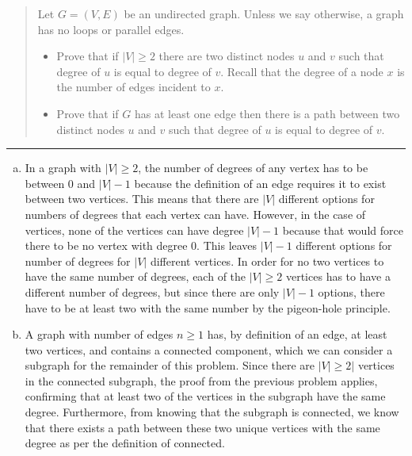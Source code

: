 \documentclass[11pt]{article}
\begin{document}



\begin{quote}
\item 
Let $G=(V,E)$ be an undirected graph. Unless we say otherwise, a graph has no loops or parallel edges.

\begin{itemize}
\item Prove that if $|V| \ge 2$ there are two distinct nodes $u$ and $v$ such that degree of $u$ is equal to degree of $v$.  Recall that the degree of a node $x$ is the number of edges incident to $x$.
\item Prove that if $G$ has at least one edge then there is a path between two distinct nodes $u$ and $v$ such that degree of $u$ is equal to degree of $v$.
\end{itemize}

\end{quote}
\hrule



\begin{solution}
\item 
\begin{enumerate}[(a)]
\item In a graph with $|V| \ge 2$, the number of degrees of any vertex has to be between 0 and $|V| - 1 $ because the definition of an edge requires it to exist between two vertices. This means that there are $|V|$ different options for numbers of degrees that each vertex can have. However, in the case of vertices, none of the vertices can have degree $|V| -1$ because that would force there to be no vertex with degree 0. 
This leaves $|V| - 1$ different options for number of degrees for $|V|$ different vertices. In order for no two vertices to have the same number of degrees, each of the $|V| \ge 2$ vertices has to have a different number of degrees, but since there are only $|V| - 1$ options, there have to be at least two with the same number by the pigeon-hole principle.
\item
A graph with number of edges $n \ge 1$ has, by definition of an edge, at least two vertices, and contains a connected component, which we can consider a subgraph for the remainder of this problem. Since there are $|V| \ge 2|$ vertices in the connected subgraph, the proof from the previous problem applies, confirming that at least two of the vertices in the subgraph have the same degree. Furthermore, from knowing that the subgraph is connected, we know that there exists a path between these two unique vertices with the same degree as per the definition of connected. 
\end{enumerate}
\end{solution}
\end{document}
